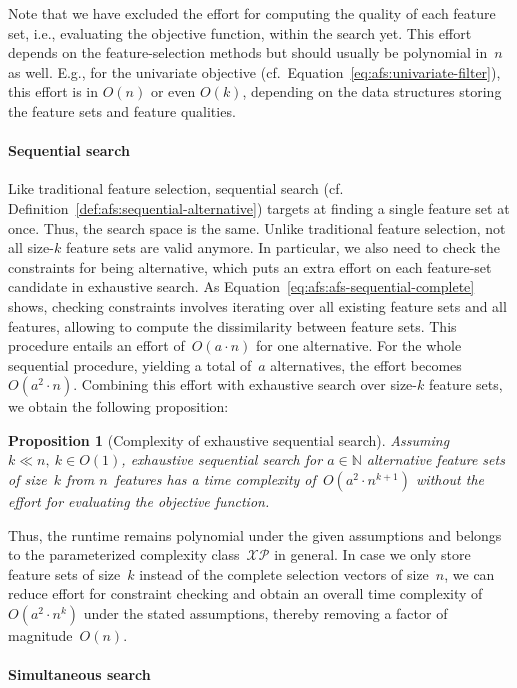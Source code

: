 \documentclass{article}
\newtheorem{proposition}{Proposition} %
\theoremstyle{definition}
\begin{document}
Note that we have excluded the effort for computing the quality of each feature set, i.e., evaluating the objective function, within the search yet.
This effort depends on the feature-selection methods but should usually be polynomial in~$n$ as well.
E.g., for the univariate objective (cf.~Equation~\ref{eq:afs:univariate-filter}), this effort is in $O(n)$ or even $O(k)$, depending on the data structures storing the feature sets and feature qualities.

\paragraph{Sequential search}

Like traditional feature selection, sequential search (cf. Definition~\ref{def:afs:sequential-alternative}) targets at finding a single feature set at once.
Thus, the search space is the same.
Unlike traditional feature selection, not all size-$k$ feature sets are valid anymore.
In particular, we also need to check the constraints for being alternative, which puts an extra effort on each feature-set candidate in exhaustive search.
As Equation~\ref{eq:afs:afs-sequential-complete} shows, checking constraints involves iterating over all existing feature sets and all features, allowing to compute the dissimilarity between feature sets.
This procedure entails an effort of~$O(a \cdot n)$ for one alternative.
For the whole sequential procedure, yielding a total of~$a$ alternatives, the effort becomes~$O(a^2 \cdot n)$.
Combining this effort with exhaustive search over size-$k$ feature sets, we obtain the following proposition:
%
\begin{proposition}[Complexity of exhaustive sequential search]
	Assuming $k \ll n,~k \in O(1)$, exhaustive sequential search for $a \in \mathbb{N}$ alternative feature sets of size~$k$ from $n$~features has a time complexity of~$O(a^2 \cdot n^{k+1})$ without the effort for evaluating the objective function.
	\label{prop:afs:complexity-exhaustive-sequential}
\end{proposition}
%
Thus, the runtime remains polynomial under the given assumptions and belongs to the parameterized complexity class~$\mathcal{XP}$ in general.
In case we only store feature sets of size~$k$ instead of the complete selection vectors of size~$n$, we can reduce effort for constraint checking and obtain an overall time complexity of~$O(a^2 \cdot n^k)$ under the stated assumptions, thereby removing a factor of magnitude~$O(n)$.


\paragraph{Simultaneous search}
\end{document}
